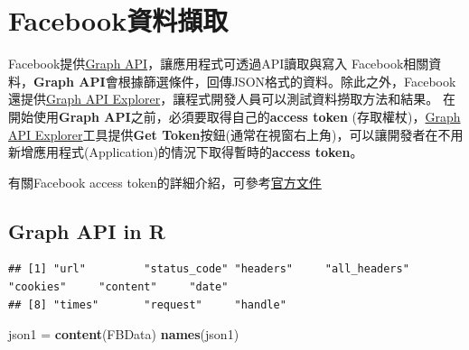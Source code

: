 \documentclass[]{book}
\newenvironment{Shaded}{\begin{snugshade}}{\end{snugshade}}
\newcommand{\KeywordTok}[1]{\textcolor[rgb]{0.13,0.29,0.53}{\textbf{{#1}}}}
\newcommand{\StringTok}[1]{\textcolor[rgb]{0.31,0.60,0.02}{{#1}}}
\newcommand{\CommentTok}[1]{\textcolor[rgb]{0.56,0.35,0.01}{\textit{{#1}}}}
\newcommand{\NormalTok}[1]{{#1}}
\theoremstyle{definition}
\theoremstyle{definition}
\theoremstyle{remark}
\begin{document}
\section{Facebook資料擷取}\label{facebook}

Facebook提供\href{https://developers.facebook.com/docs/graph-api?locale=zh_TW}{Graph
API}，讓應用程式可透過API讀取與寫入 Facebook相關資料，\textbf{Graph
API}會根據篩選條件，回傳JSON格式的資料。除此之外，Facebook還提供\href{https://developers.facebook.com/tools/explorer/}{Graph
API Explorer}，讓程式開發人員可以測試資料撈取方法和結果。
在開始使用\textbf{Graph API}之前，必須要取得自己的\textbf{access token}
(存取權杖)，\href{https://developers.facebook.com/tools/explorer/}{Graph
API Explorer}工具提供\textbf{Get
Token}按鈕(通常在視窗右上角)，可以讓開發者在不用新增應用程式(Application)的情況下取得暫時的\textbf{access
token}。

有關Facebook access
token的詳細介紹，可參考\href{https://developers.facebook.com/docs/facebook-login/access-tokens/?locale=zh_TW}{官方文件}

\subsection{Graph API in R}\label{graph-api-in-r}

\begin{Shaded}
\end{Shaded}

\begin{verbatim}
## [1] "url"         "status_code" "headers"     "all_headers" "cookies"     "content"     "date"       
## [8] "times"       "request"     "handle"    
\end{verbatim}

\begin{Shaded}
\begin{Highlighting}[]
\NormalTok{json1 =}\StringTok{ }\KeywordTok{content}\NormalTok{(FBData)}
\KeywordTok{names}\NormalTok{(json1)}
\end{Highlighting}
\end{Shaded}
\end{document}

